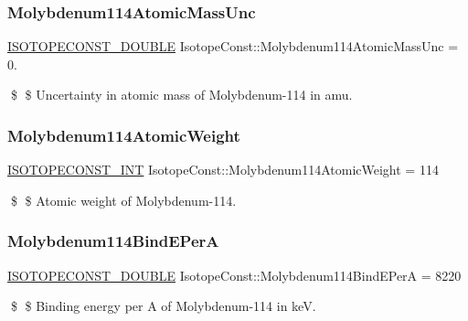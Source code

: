 \subsubsection{\texorpdfstring{Molybdenum114\+Atomic\+Mass\+Unc}{Molybdenum114AtomicMassUnc}}
{\footnotesize\ttfamily \mbox{\hyperlink{group___isotope_const-_macros_ga8f45a7272ce02c0b4c65c44636ed719a}{I\+S\+O\+T\+O\+P\+E\+C\+O\+N\+S\+T\+\_\+\+D\+O\+U\+B\+LE}} Isotope\+Const\+::\+Molybdenum114\+Atomic\+Mass\+Unc = 0.}

\$ \$ Uncertainty in atomic mass of Molybdenum-\/114 in amu. \mbox{\label{group___isotope_const-_molybdenum-_mo114_gabcc57a5d9f626824a0ab600ee02e596f}} 
\subsubsection{\texorpdfstring{Molybdenum114\+Atomic\+Weight}{Molybdenum114AtomicWeight}}
{\footnotesize\ttfamily \mbox{\hyperlink{group___isotope_const-_macros_ga5f18360b3e99483a35c32d789e62621c}{I\+S\+O\+T\+O\+P\+E\+C\+O\+N\+S\+T\+\_\+\+I\+NT}} Isotope\+Const\+::\+Molybdenum114\+Atomic\+Weight = 114}

\$ \$ Atomic weight of Molybdenum-\/114. \mbox{\label{group___isotope_const-_molybdenum-_mo114_ga8a51701218b7c74086916304d0e8163a}} 
\subsubsection{\texorpdfstring{Molybdenum114\+Bind\+E\+PerA}{Molybdenum114BindEPerA}}
{\footnotesize\ttfamily \mbox{\hyperlink{group___isotope_const-_macros_ga8f45a7272ce02c0b4c65c44636ed719a}{I\+S\+O\+T\+O\+P\+E\+C\+O\+N\+S\+T\+\_\+\+D\+O\+U\+B\+LE}} Isotope\+Const\+::\+Molybdenum114\+Bind\+E\+PerA = 8220}

\$ \$ Binding energy per A of Molybdenum-\/114 in keV. \mbox{\label{group___isotope_const-_molybdenum-_mo114_gaefa9e01792df63807f9660921589f0b7}} 

